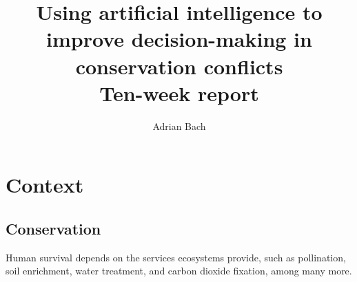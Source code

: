\documentclass[12pt,a4paper]{article}
\author{Adrian Bach}
\title{Using artificial intelligence to improve decision-making in conservation conflicts \\\medskip Ten-week report}
\begin{document}
\maketitle

\tableofcontents

\newpage
\section{Context}
\subsection{Conservation}

Human survival depends on the services ecosystems provide, such as pollination, soil enrichment, water treatment, and carbon dioxide fixation, among many more.
\end{document}

